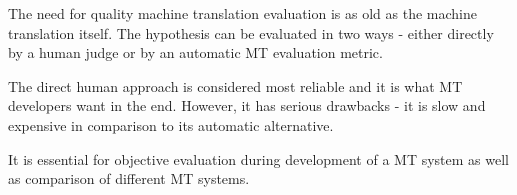 % 
%



The need for quality machine translation evaluation is as old as the machine 
translation itself. The hypothesis can be evaluated in two ways - either 
directly by a human judge or by an automatic MT evaluation metric.

The direct human approach is considered most reliable and it is what MT 
developers want in the end. However, it has serious drawbacks - it is slow
and expensive in comparison to its automatic alternative.

It is essential for objective evaluation during development 
of a MT system as well as comparison of different MT systems.




